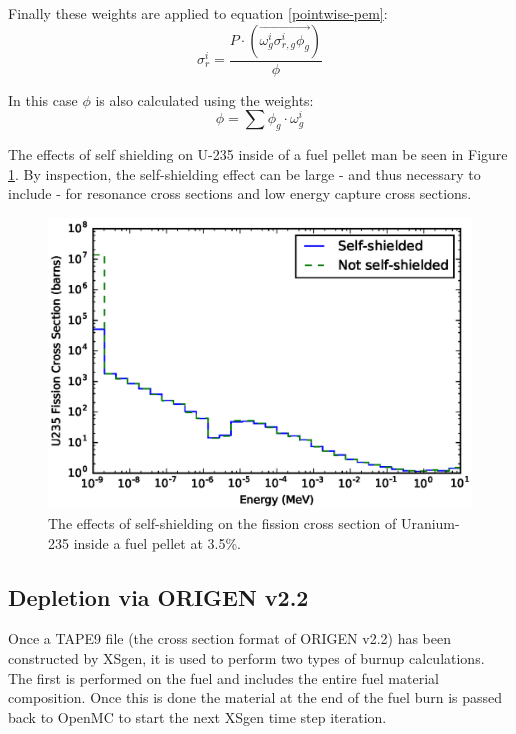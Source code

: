 \documentclass{article}
\begin{document}
Finally these weights are applied to equation \ref{pointwise-pem}:
\begin{equation}
\label{ssww}
\sigma_{r}^i=\frac{P \cdot (\overrightarrow{\omega_g^i\sigma_{r,g}^i \phi_g})}{\phi}
\end{equation}

In this case $\phi$ is also calculated using the weights:
\begin{equation}
\label{phiw}
\phi=\sum\phi_g \cdot \omega_g^i
\end{equation}

The effects of self shielding on U-235 inside of a fuel pellet man be seen in
Figure \ref{fig:index}. By inspection, the self-shielding effect can be large - and thus
necessary to include - for resonance cross sections and low energy capture cross sections.
\begin{figure}[h]
  \center
  \includegraphics[scale=0.6]{index.eps}
  \caption{The effects of self-shielding on the fission cross section of Uranium-235 inside a fuel pellet at 3.5\%.}
  \label{fig:index}
\end{figure}

\subsection{Depletion via ORIGEN v2.2}
\label{sec:origen}

Once a TAPE9 file (the cross section format of ORIGEN v2.2) has been constructed by XSgen, it is
used to perform two types of burnup calculations. The first is performed on the fuel and
includes the entire fuel material composition. Once this is done the material at the
end of the fuel burn is passed back to OpenMC to start the next XSgen time step iteration.
\end{document}
